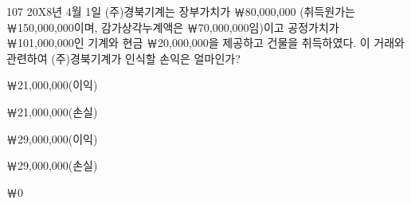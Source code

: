 \begin{question}{107}
20X8년 4월 1일 (주)경북기계는 장부가치가 ￦80,000,000 (취득원가는 ￦150,000,000이며, 감가상각누계액은 ￦70,000,000임)이고 공정가치가 ￦101,000,000인 기계와 현금 ￦20,000,000을 제공하고 건물을 취득하였다. 이 거래와 관련하여 (주)경북기계가 인식할 손익은 얼마인가?
\begin{choices}
  \item ￦21,000,000(이익)
  \item ￦21,000,000(손실)
  \item ￦29,000,000(이익)
  \item ￦29,000,000(손실)
  \item ￦0
\end{choices}
\end{question}
